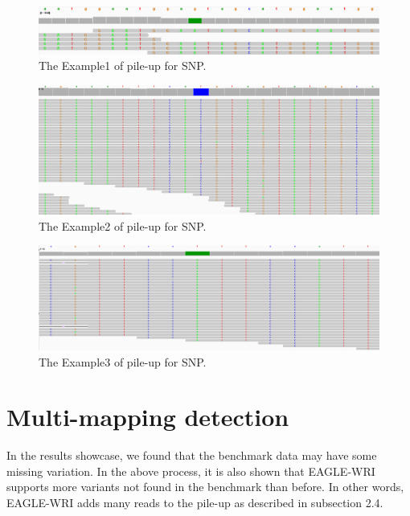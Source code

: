 \documentclass[PhD]{PHlab-thesis}
\begin{document}
\begin{figure}[h!]
	\centering
	\includegraphics[scale=0.3]{figures/SNP3.png}
	\caption{The Example1 of pile-up for SNP.}
	\label{fig:The Example of pile-up for SNP1} %
\end{figure}

\begin{figure}[h!]
	\centering
	\includegraphics[scale=0.25]{figures/SNP2.png}
	\caption{The Example2 of pile-up for SNP.}
	\label{fig:The Example of pile-up for SNP2} %
\end{figure}

\begin{figure}[h!]
	\centering
	\includegraphics[scale=0.25]{figures/SNP1.png}
	\caption{The Example3 of pile-up for SNP.}
	\label{fig:The Example of pile-up for SNP3} %
\end{figure}


\section{Multi-mapping detection}
In the results showcase, we found that the benchmark data may have some missing variation. In the above process, it is also shown that EAGLE-WRI supports more variants not found in the benchmark than before. In other words, EAGLE-WRI adds many reads to the pile-up as described in subsection 2.4.
\end{document}
